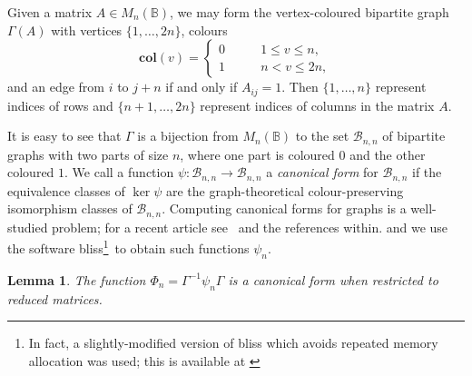 \documentclass[11pt]{article}
\newtheorem{lemma}[thm]{Lemma}
\numberwithin{equation}{section}
\renewcommand{\to}{\longrightarrow}
\newcommand{\B}{\mathbb{B}}
\newcommand{\Bn}{M_n(\B)}
\newcommand{\BGSet}{\mathcal{B}_{n,n}}
\begin{document}
Given a matrix $A \in \Bn$, we may form the vertex-coloured bipartite graph
$\Gamma(A)$ with vertices $\{1, \ldots, 2n\}$, colours 
\[\mathbf{col}(v) = \begin{cases}
    0 \qquad &1 \leq v \leq n, \\
    1 \qquad &n < v \leq 2n,
  \end{cases}
\]
and an edge from $i$ to $j+n$ if and only if $A_{ij} = 1$. Then $\{1, \ldots,
  n\}$ represent indices of rows and $\{n + 1, \ldots, 2n\}$ represent indices
of columns in the matrix $A$.

It is easy to see that $\Gamma$ is a bijection from $\Bn$ to the set $\BGSet$ of
bipartite graphs with two parts of size $n$, where one part is coloured $0$ and
the other coloured $1$. We call a function $\psi: \BGSet \to \BGSet$ a
\emph{canonical form} for $\BGSet$ if the equivalence classes of $\ker\psi$ are
the graph-theoretical colour-preserving isomorphism classes of $\BGSet$.
Computing canonical forms for graphs is a well-studied problem; for a recent
article see~\cite{TODO:BrendanMackay} and the references within. 
and we use the software bliss\footnote{In fact, a slightly-modified version of
  bliss which avoids repeated memory allocation was used; this is available at
  \cite{TODO}}~\cite{TODO:BLISS}to obtain such functions $\psi_n$. 
\begin{lemma}
  The function $\Phi_n = \Gamma^{-1}\psi_n\Gamma$ is a canonical form when
  restricted to reduced matrices. 
\end{lemma}
\end{document}
